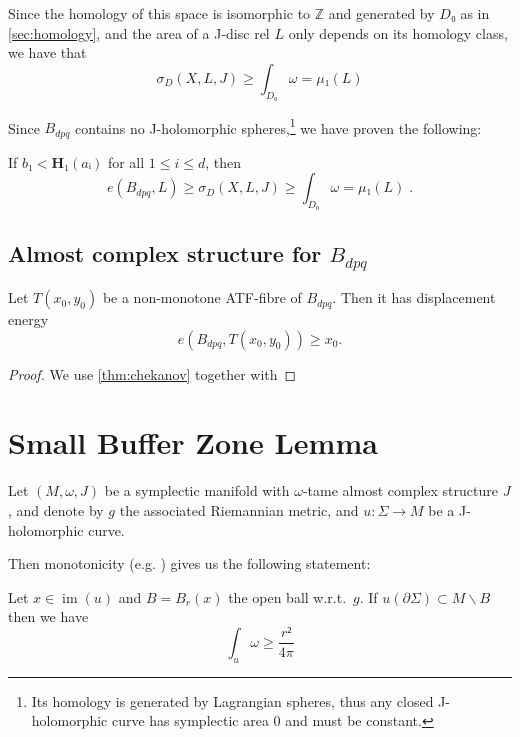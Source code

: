 \documentclass[12pt,a4paper,draft]{scrartcl}
\DeclareMathOperator{\im}{im}
\begin{document}
Since the homology of this space is isomorphic to \(ℤ\) and generated by \(D₀\) as in \cref{sec:homology}, and the area of a J-disc rel \(L\) only depends on its homology class, we have that
\[σ_D(X,L,J) ≥ ∫_{D₀} ω  = μ₁(L)\]

Since \(B_{dpq}\) contains no J-holomorphic spheres,\footnote{Its homology is generated by Lagrangian spheres, thus any closed J-holomorphic curve has symplectic area $0$ and must be constant.} we have proven the following:

\begin{lemma}
  If \(b₁ < \symbf{H}₁(aᵢ)\) for all \(1 ≤ i ≤ d\), then
  \[e(B_{dpq},L) ≥ σ_D(X,L,J) ≥ ∫_{D₀} ω  = μ₁(L) \; .\]
\end{lemma}


\subsection{Almost complex structure for \texorpdfstring{\(B_{dpq}\)}{Bdpq}}


\begin{proposition}
\label{prop:bdpq}
Let $T(x_0,y_0)$ be a non-monotone ATF-fibre of $B_{dpq}$.
Then it has displacement energy
\[e(B_{dpq}, T(x_0,y_0)) ≥ x_0 .\]
\end{proposition}

\begin{proof}
    We use \cref{thm:chekanov} together with %
\end{proof}


\section{Small Buffer Zone Lemma}

Let \((M,ω,J)\) be a symplectic manifold with \(ω\)-tame almost complex structure \(J\), and denote by \(g\) the associated Riemannian metric, and \(u\colon Σ → M\) be a J-holomorphic curve.

Then monotonicity (e.g. \cite[Proposition 4.3.1 (ii)]{sikorav1994}) gives us the following statement:

\begin{lemma}[Monotonicity]
  \label{lem:monotonicity}
  Let \(x ∈ \im(u)\) and \(B = B_r(x)\) the open ball w.r.t.\ \(g\). If \(u(∂Σ) ⊂ M ∖ B\) then we have
  \[∫_u ω ≥ \frac{r²}{4π}\]
\end{lemma}
\end{document}
